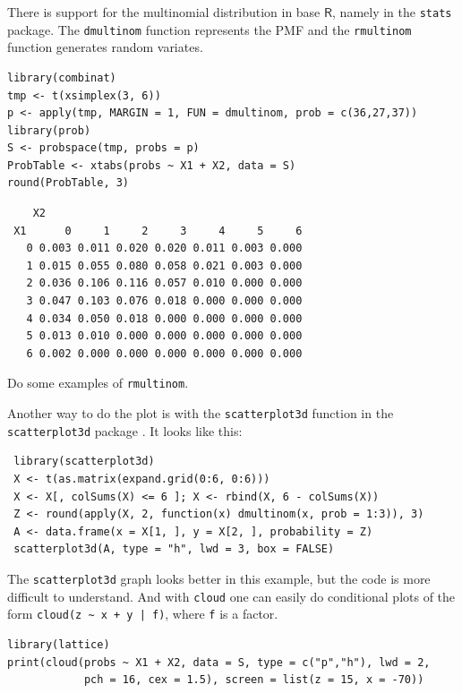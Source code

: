 \documentclass[captions=tableheading]{scrbook}
\begin{document}
There is support for the multinomial distribution in base \(\mathsf{R}\), namely in the \texttt{stats} package. The \texttt{dmultinom} function represents the PMF and the \texttt{rmultinom} function generates random variates.




\begin{verbatim}
library(combinat)
tmp <- t(xsimplex(3, 6))
p <- apply(tmp, MARGIN = 1, FUN = dmultinom, prob = c(36,27,37))
library(prob)
S <- probspace(tmp, probs = p)
ProbTable <- xtabs(probs ~ X1 + X2, data = S)
round(ProbTable, 3)
\end{verbatim}

\begin{verbatim}
    X2
 X1      0     1     2     3     4     5     6
   0 0.003 0.011 0.020 0.020 0.011 0.003 0.000
   1 0.015 0.055 0.080 0.058 0.021 0.003 0.000
   2 0.036 0.106 0.116 0.057 0.010 0.000 0.000
   3 0.047 0.103 0.076 0.018 0.000 0.000 0.000
   4 0.034 0.050 0.018 0.000 0.000 0.000 0.000
   5 0.013 0.010 0.000 0.000 0.000 0.000 0.000
   6 0.002 0.000 0.000 0.000 0.000 0.000 0.000
\end{verbatim}

Do some examples of \texttt{rmultinom}.

Another way to do the plot is with the \texttt{scatterplot3d} function in the \texttt{scatterplot3d} package \cite{Liggesscatterplot3d}. It looks like this: 
\begin{verbatim}
 library(scatterplot3d)
 X <- t(as.matrix(expand.grid(0:6, 0:6)))
 X <- X[, colSums(X) <= 6 ]; X <- rbind(X, 6 - colSums(X))
 Z <- round(apply(X, 2, function(x) dmultinom(x, prob = 1:3)), 3)
 A <- data.frame(x = X[1, ], y = X[2, ], probability = Z)
 scatterplot3d(A, type = "h", lwd = 3, box = FALSE)
\end{verbatim}
The \texttt{scatterplot3d} graph looks better in this example, but the code is more difficult to understand. And with \texttt{cloud} one can easily do conditional plots of the form \texttt{cloud(z \textasciitilde{} x + y | f)}, where \texttt{f} is a factor.


\begin{verbatim}
library(lattice)
print(cloud(probs ~ X1 + X2, data = S, type = c("p","h"), lwd = 2, 
            pch = 16, cex = 1.5), screen = list(z = 15, x = -70))
\end{verbatim}
\end{document}
